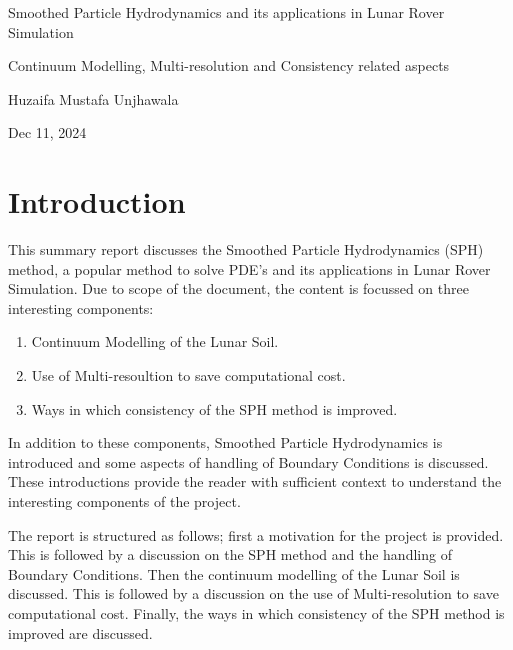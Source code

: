 \documentclass{article}
\begin{document}
\begin{center}
    \LARGE Smoothed Particle Hydrodynamics and its applications in Lunar Rover Simulation
\end{center}

\begin{center}
    \large Continuum Modelling, Multi-resolution and Consistency related aspects
\end{center}

\begin{center}
    \large Huzaifa Mustafa Unjhawala
\end{center}

\begin{center}
    \large Dec 11, 2024
\end{center}


\section{Introduction}
This summary report discusses the Smoothed Particle Hydrodynamics (SPH) method, a popular method to solve PDE's and its applications in Lunar Rover Simulation. Due to scope of the document, the content is focussed on three interesting components: 

\begin{enumerate}
    \item Continuum Modelling of the Lunar Soil.
    \item Use of Multi-resoultion to save computational cost.
    \item Ways in which consistency of the SPH method is improved.
\end{enumerate}
In addition to these components, Smoothed Particle Hydrodynamics is introduced and some aspects of handling of Boundary Conditions is discussed. These introductions provide the reader with sufficient context to understand the interesting components of the project.  

The report is structured as follows; first a motivation for the project is provided. This is followed by a discussion on the SPH method and the handling of Boundary Conditions. Then the continuum modelling of the Lunar Soil is discussed. This is followed by a discussion on the use of Multi-resolution to save computational cost. Finally, the ways in which consistency of the SPH method is improved are discussed.
\end{document}
